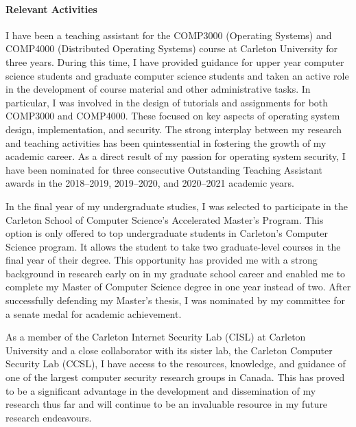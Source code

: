 \paragraph*{Relevant Activities}
I have been a teaching assistant for the COMP3000 (Operating Systems) and COMP4000
(Distributed Operating Systems) course at Carleton University for three years. During this
time, I have provided guidance for upper year computer science students and graduate
computer science students and taken an active role in the development of course material
and other administrative tasks. In particular, I was involved in the design of tutorials
and assignments for both COMP3000 and COMP4000. These focused on key aspects of operating
system design, implementation, and security.  The strong
interplay between my research and teaching activities has been quintessential in fostering
the growth of my academic career. As a direct result of my passion for operating system
security, I have been nominated for three consecutive Outstanding Teaching Assistant
awards in the 2018--2019, 2019--2020, and 2020--2021 academic years.


In the final year of my undergraduate studies, I was selected to participate in the
Carleton School of Computer Science's Accelerated Master's Program. This option is only
offered to top undergraduate students in Carleton's Computer Science program. It allows
the student to take two graduate-level courses in the final year of their degree. This
opportunity has provided me with a strong background in research early on in my graduate
school career and enabled me to complete my Master of Computer Science degree in one year
instead of two.  After successfully defending my Master's thesis, I was nominated by my
committee for a senate medal for academic achievement.

As a member of the Carleton Internet Security Lab (CISL) at Carleton University
and a close collaborator with its sister lab, the Carleton Computer Security Lab
(CCSL), I have access to the resources, knowledge, and guidance of one of the
largest computer security research groups in Canada. This has proved to be
a significant advantage in the development and dissemination of my research thus
far and will continue to be an invaluable resource in my future research
endeavours.
